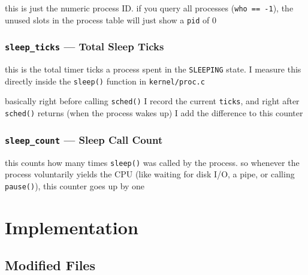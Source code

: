 \documentclass[12pt]{report}
\begin{document}
this is just the numeric process ID. if you query all processes (\texttt{who~==~-1}), the unused slots in the process table will just show a \texttt{pid} of 0

\subsection{\texttt{sleep\_ticks} --- Total Sleep Ticks}

this is the total timer ticks a process spent in the \texttt{SLEEPING} state. I measure this directly inside the \texttt{sleep()} function in \texttt{kernel/proc.c}

basically right before calling \texttt{sched()} I record the current \texttt{ticks}, and right after \texttt{sched()} returns (when the process wakes up) I add the difference to this counter

\subsection{\texttt{sleep\_count} --- Sleep Call Count}

this counts how many times \texttt{sleep()} was called by the process. so whenever the process voluntarily yields the CPU (like waiting for disk I/O, a pipe, or calling \texttt{pause()}), this counter goes up by one

\chapter{Implementation}

\section{Modified Files}
\end{document}
